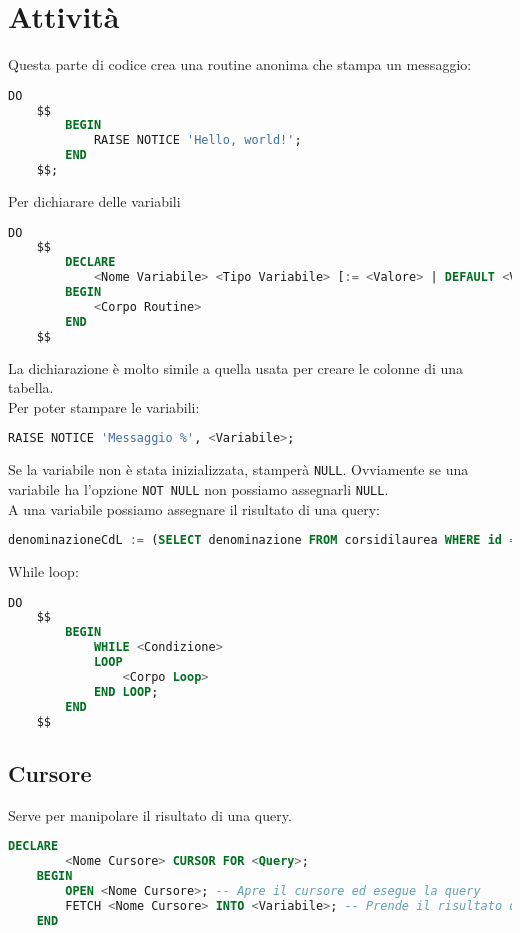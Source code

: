 \documentclass[12pt]{article}
\begin{document}
\section{Attività}
Questa parte di codice crea una routine anonima che stampa un messaggio:
\begin{lstlisting}[language=SQL]
    DO
    $$
        BEGIN
            RAISE NOTICE 'Hello, world!';
        END
    $$;
\end{lstlisting}
Per dichiarare delle variabili
\begin{lstlisting}[language=SQL]
    DO
    $$
        DECLARE
            <Nome Variabile> <Tipo Variabile> [:= <Valore> | DEFAULT <Valore>];
        BEGIN
            <Corpo Routine>
        END
    $$
\end{lstlisting}
La dichiarazione è molto simile a quella usata per creare le colonne di una tabella.\\
Per poter stampare le variabili:
\begin{lstlisting}[language=SQL]
    RAISE NOTICE 'Messaggio %', <Variabile>;
\end{lstlisting}
Se la variabile non è stata inizializzata, stamperà \texttt{NULL}. Ovviamente se una variabile ha l'opzione \texttt{NOT NULL} non possiamo assegnarli \texttt{NULL}.\\
A una variabile possiamo assegnare il risultato di una query:
\begin{lstlisting}[language=SQL]
    denominazioneCdL := (SELECT denominazione FROM corsidilaurea WHERE id = 9)
\end{lstlisting}
While loop:
\begin{lstlisting}[language=SQL]
    DO
    $$
        BEGIN
            WHILE <Condizione>
            LOOP
                <Corpo Loop>
            END LOOP;
        END
    $$
\end{lstlisting}
\subsection{Cursore}
Serve per manipolare il risultato di una query.
\begin{lstlisting}[language=SQL]
    DECLARE
        <Nome Cursore> CURSOR FOR <Query>;
    BEGIN
        OPEN <Nome Cursore>; -- Apre il cursore ed esegue la query
        FETCH <Nome Cursore> INTO <Variabile>; -- Prende il risultato della query e lo mette nella variabile
    END
\end{lstlisting}
\end{document}
